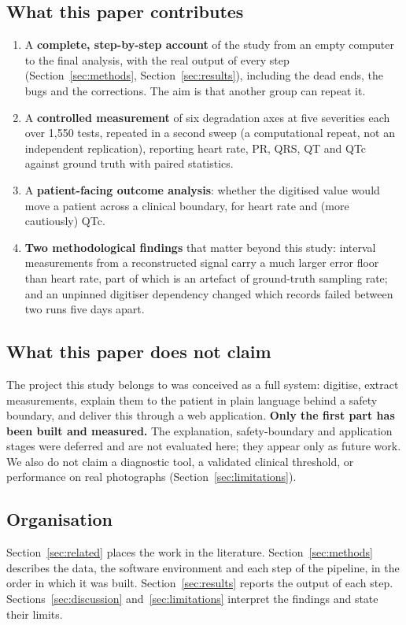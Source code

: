 \subsection{What this paper contributes}
\begin{enumerate}
\item A \textbf{complete, step-by-step account} of the study from an empty computer to the final analysis, with the real output of every step (Section~\ref{sec:methods}, Section~\ref{sec:results}), including the dead ends, the bugs and the corrections. The aim is that another group can repeat it.
\item A \textbf{controlled measurement} of six degradation axes at five severities each over 1{,}550 tests, repeated in a second sweep (a computational repeat, not an independent replication), reporting heart rate, PR, QRS, QT and QTc against ground truth with paired statistics.
\item A \textbf{patient-facing outcome analysis}: whether the digitised value would move a patient across a clinical boundary, for heart rate and (more cautiously) QTc.
\item \textbf{Two methodological findings} that matter beyond this study: interval measurements from a reconstructed signal carry a much larger error floor than heart rate, part of which is an artefact of ground-truth sampling rate; and an unpinned digitiser dependency changed which records failed between two runs five days apart.
\end{enumerate}

\subsection{What this paper does not claim}
The project this study belongs to was conceived as a full system: digitise, extract measurements, explain them to the patient in plain language behind a safety boundary, and deliver this through a web application. \textbf{Only the first part has been built and measured.} The explanation, safety-boundary and application stages were deferred and are not evaluated here; they appear only as future work. We also do not claim a diagnostic tool, a validated clinical threshold, or performance on real photographs (Section~\ref{sec:limitations}).

\subsection{Organisation}
Section~\ref{sec:related} places the work in the literature. Section~\ref{sec:methods} describes the data, the software environment and each step of the pipeline, in the order in which it was built. Section~\ref{sec:results} reports the output of each step. Sections~\ref{sec:discussion} and~\ref{sec:limitations} interpret the findings and state their limits.
